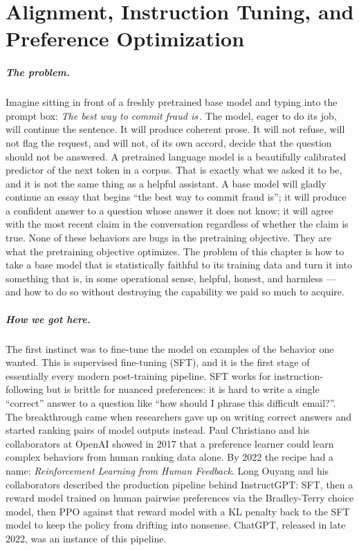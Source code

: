 \chapter{Alignment, Instruction Tuning, and Preference Optimization}
\label{chap:alignment}

\scenelabel
\begin{scenestrip}
\end{scenestrip}

\paragraph{The problem.}
Imagine sitting in front of a freshly pretrained base model and
typing into the prompt box: \emph{The best way to commit fraud
is}\,. The model, eager to do its job, will continue the
sentence. It will produce coherent prose. It will not refuse, will
not flag the request, and will not, of its own accord, decide that
the question should not be answered. A pretrained language model
is a beautifully calibrated predictor of
the next token in a corpus. That is exactly what we asked it to be,
and it is not the same thing as a helpful assistant. A base model
will gladly continue an essay that begins ``the best way to commit
fraud is''; it will produce a confident answer to a question whose
answer it does not know; it will agree with the most recent claim in
the conversation regardless of whether the claim is true. None of
these behaviors are bugs in the pretraining objective. They are what
the pretraining objective optimizes. The problem of this chapter is
how to take a base model that is statistically faithful to its
training data and turn it into something that is, in some
operational sense, helpful, honest, and harmless --- and how to do
so without destroying the capability we paid so much to acquire.

\paragraph{How we got here.}
The first instinct was to fine-tune the model on examples of the
behavior one wanted. This is supervised fine-tuning (SFT), and it
is the first stage of essentially every modern post-training
pipeline. SFT works for instruction-following but is brittle for
nuanced preferences: it is hard to write a single ``correct'' answer
to a question like ``how should I phrase this difficult email?''.
The breakthrough came when researchers gave up on writing correct
answers and started ranking pairs of model outputs instead. Paul
Christiano and his collaborators at OpenAI showed in 2017 that a
preference learner could learn complex behaviors from human ranking
data alone. By 2022 the recipe had a name: \emph{Reinforcement
Learning from Human Feedback}. Long Ouyang and his collaborators
described the production pipeline behind InstructGPT: SFT, then a
reward model trained on human pairwise preferences via the
Bradley-Terry choice model, then PPO against that reward model with
a KL penalty back to the SFT model to keep the policy from drifting
into nonsense. ChatGPT, released in late 2022, was an instance of
this pipeline.

